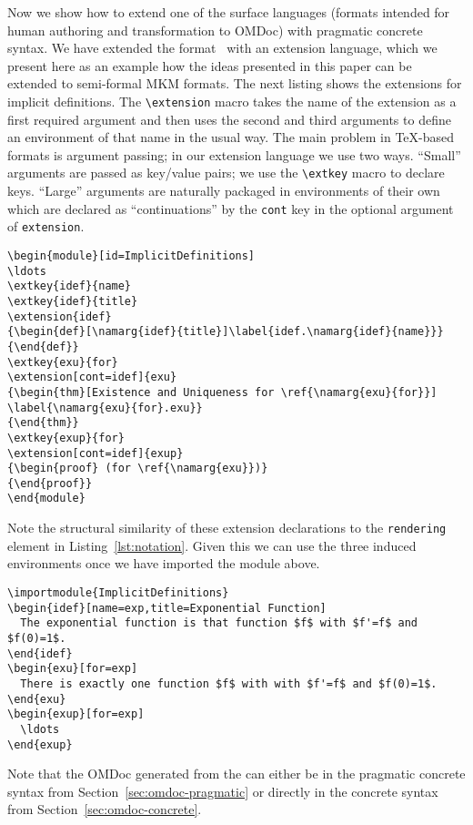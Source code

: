 Now we show how to extend one of the {\omdoc} surface languages (formats intended for
human authoring and transformation to OMDoc) with pragmatic concrete syntax. We have
extended the \sTeX format~\cite{Kohlhase:ulsmf08} with an extension language, which we
present here as an example how the ideas presented in this paper can be extended to
semi-formal MKM formats. The next listing shows the extensions for implicit definitions.
The \lstinline|\extension| macro takes the name of the extension as a first required
argument and then uses the second and third arguments to define an environment of that
name in the usual way. The main problem in {\TeX}-based formats is argument passing; in
our extension language we use two ways. ``Small'' arguments are passed as key/value pairs;
we use the \lstinline|\extkey| macro to declare keys. ``Large'' arguments are naturally
packaged in environments of their own which are declared as ``continuations'' by the
\lstinline|cont| key in the optional argument of \lstinline|extension|. 

\begin{lstlisting}[caption=Extending \protect\sTeX by Implicit Definitions]
\begin{module}[id=ImplicitDefinitions]
\ldots
\extkey{idef}{name}
\extkey{idef}{title}
\extension{idef}
{\begin{def}[\namarg{idef}{title}]\label{idef.\namarg{idef}{name}}}
{\end{def}}
\extkey{exu}{for}
\extension[cont=idef]{exu}
{\begin{thm}[Existence and Uniqueness for \ref{\namarg{exu}{for}}]
\label{\namarg{exu}{for}.exu}}
{\end{thm}}
\extkey{exup}{for}
\extension[cont=idef]{exup}
{\begin{proof} (for \ref{\namarg{exu}})}
{\end{proof}}
\end{module}
\end{lstlisting}
Note the structural similarity of these extension declarations to the
\lstinline[language={[1.3]OMDoc}]|rendering| element in
Listing~\ref{lst:notation}.
Given this we can use the three induced environments
once we have imported the module above. 

\begin{lstlisting}[language={[sTeX]TeX},morekeywords={extkey,extension}]
\importmodule{ImplicitDefinitions}
\begin{idef}[name=exp,title=Exponential Function]
  The exponential function is that function $f$ with $f'=f$ and $f(0)=1$.
\end{idef}
\begin{exu}[for=exp]
  There is exactly one function $f$ with with $f'=f$ and $f(0)=1$.
\end{exu}
\begin{exup}[for=exp]
  \ldots
\end{exup}
\end{lstlisting}
Note that the OMDoc generated from the \sTeX can either be in the pragmatic concrete syntax from
Section~\ref{sec:omdoc-pragmatic} or directly in the concrete syntax from
Section~\ref{sec:omdoc-concrete}.


